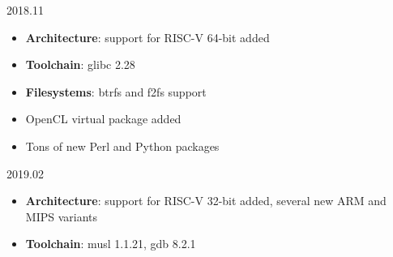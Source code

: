 \begin{frame}{2018.11}
  \begin{itemize}
  \item {\bf Architecture}: support for RISC-V 64-bit added
  \item {\bf Toolchain}: glibc 2.28
  \item {\bf Filesystems}: btrfs and f2fs support
  \item OpenCL virtual package added
  \item Tons of new Perl and Python packages
  \end{itemize}
\end{frame}

\begin{frame}{2019.02}
  \begin{itemize}
  \item {\bf Architecture}: support for RISC-V 32-bit added, several
    new ARM and MIPS variants
  \item {\bf Toolchain}: musl 1.1.21, gdb 8.2.1
  \end{itemize}
\end{frame}
